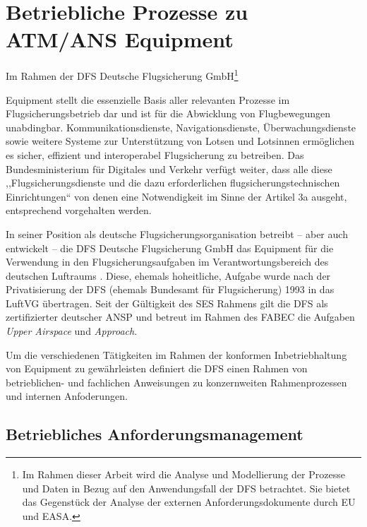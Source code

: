 \chapter{Betriebliche Prozesse zu ATM/ANS Equipment}

\begin{center}
    \footnotesize
    Im Rahmen der DFS Deutsche Flugsicherung GmbH\footnote{Im Rahmen dieser Arbeit wird die Analyse und Modellierung der Prozesse und Daten in Bezug auf den Anwendungsfall der DFS betrachtet. Sie bietet das Gegenstück der Analyse der externen Anforderungsdokumente durch EU und EASA.}
\end{center}

\noindent
\atmans Equipment stellt die essenzielle Basis aller relevanten Prozesse im Flugsicherungsbetrieb dar und ist für die Abwicklung von Flugbewegungen unabdingbar. 
Kommunikationsdienste, Navigationsdienste, Überwachungsdienste sowie weitere Systeme zur Unterstützung von Lotsen und Lotsinnen ermöglichen es sicher, effizient und interoperabel Flugsicherung zu betreiben.
Das Bundesministerium für Digitales und Verkehr verfügt weiter, dass alle diese ,,Flugsicherungsdienste und die dazu erforderlichen flugsicherungstechnischen Einrichtungen`` von denen eine Notwendigkeit im Sinne der  Artikel 3a ausgeht, entsprechend vorgehalten werden.
\cite[§27 d]{luftvg}

In seiner Position als deutsche Flugsicherungsorganisation betreibt -- aber auch entwickelt -- die DFS Deutsche Flugsicherung GmbH das \atmans Equipment für die Verwendung in den Flugsicherungsaufgaben im Verantwortungsbereich des deutschen Luftraums 
\cite[§27 c]{luftvg}.
Diese, ehemals hoheitliche, Aufgabe wurde nach der Privatisierung der \ac{DFS} (ehemals Bundesamt für Flugsicherung) 1993 in das \ac{LuftVG} übertragen.
Seit der Gültigkeit des \ac{SES} Rahmens gilt die \ac{DFS} als zertifizierter deutscher \acf{ANSP} und betreut im Rahmen des \ac{FABEC} die Aufgaben \textit{Upper Airspace} und \textit{Approach}. 

Um die verschiedenen Tätigkeiten im Rahmen der konformen Inbetriebhaltung von \atmans Equipment zu gewährleisten definiert die \ac{DFS} einen Rahmen von betrieblichen- und fachlichen Anweisungen zu konzernweiten Rahmenprozessen und internen Anfoderungen. \cite{fa_freigaben,ba_technik}   




    \section{Betriebliches Anforderungsmanagement}

